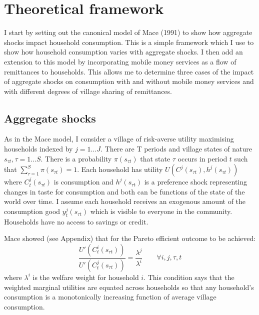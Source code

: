 \newpage
\section{Theoretical framework}
I start by setting out the canonical model of Mace (1991)  \nocite{mace1991full} to show how aggregate shocks impact household consumption. This is a simple framework which I use to show how household consumption varies with aggregate shocks. I then add an extension to this model by incorporating mobile money services as a flow of remittances to households. This allows me to determine three cases of the impact of aggregate shocks on consumption with and without mobile money services and with different degrees of village sharing of remittances.   

\subsection{Aggregate shocks}

As in the Mace model, I consider a village of risk-averse utility maximising households indexed by $j=1 \ldots J$. There are T periods and village states of nature $s_{\tau t}, \tau=1 \ldots S$. There is a probability $\pi(s_{\tau t})$ that state $\tau$ occurs in period $t$ such that $\sum_{\tau=1}^{S} \pi(s_{\tau t})=1$.  Each household has utility $U(C^j(s_{\tau t}),h^j(s_{\tau t}))$ where $C^j_t(s_{\tau t})$ is consumption and $h^j(s_{\tau t})$ is a preference shock representing changes in taste for consumption and both can be functions of the state of the world over time. I assume each household receives an exogenous amount of the consumption good $y_t^j(s_{\tau t})$ which is visible to everyone in the community. Households have no access to savings or credit. 

Mace showed (see Appendix) that for the Pareto efficient outcome to be achieved:
\begin{equation} \label{eq: FOC1}
\frac{U'(C^i_t(s_{\tau t}))}{U'(C^j_t(s_{\tau t}))}=\frac{\lambda^j}{\lambda^i} \qquad \forall i, j, \tau, t
\end{equation}
where $\lambda^i$ is the welfare weight for household $i$. This condition says that the weighted marginal utilities are equated across households so that any household's consumption is a monotonically increasing function of average village consumption. 

